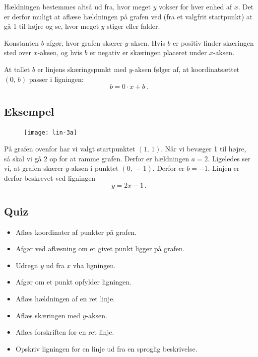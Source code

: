 \documentclass[12pt,oneside,a4paper]{article}
\begin{document}
Hældningen bestemmes altså ud fra, hvor meget $y$ vokser for hver enhed af $x$. Det
er derfor muligt at aflæse hældningen på grafen ved (fra et valgfrit startpunkt)
at gå 1 til højre og se, hvor meget $y$ stiger eller falder.

Konstanten $b$ afgør, hvor grafen skærer $y$-aksen. Hvis $b$ er positiv finder
skæringen sted over $x$-aksen, og hvis $b$ er negativ er skæringen placeret under $x$-aksen.

At tallet $b$ er linjens skæringspunkt med $y$-aksen følger af, at
koordinatsættet $(0,\,b)$ passer i ligningen:
$$
b = 0\cdot x+b \,.
$$


\subsection{Eksempel}
\begin{figure}[H]
    \centering
    \texttt{[image: lin-3a]}
    \caption{}
\end{figure}

På grafen ovenfor har vi valgt startpunktet $(1,\,1)$. Når vi bevæger
1 til højre, så skal vi gå 2 op for at ramme grafen. Derfor er hældningen $a=2$.
Ligeledes ser vi, at grafen skærer $y$-aksen i punktet $(0,\,-1)$. Derfor er
$b=-1$.
Linjen er derfor beskrevet ved ligningen
\[
    y=2x-1\,.
\]


%


\subsection{Quiz}
\begin{itemize}
    \item Aflæs koordinater af punkter på grafen.
    \item Afgør ved aflæsning om et givet punkt ligger på grafen.
    \item Udregn $y$ ud fra $x$ vha ligningen.
    \item Afgør om et punkt opfylder ligningen.
    \item Aflæs hældningen af en ret linje.
    \item Aflæs skæringen med $y$-aksen.
    \item Aflæs forskriften for en ret linje.
    \item Opskriv ligningen for en linje ud fra en sproglig beskrivelse.
\end{itemize}
\end{document}
